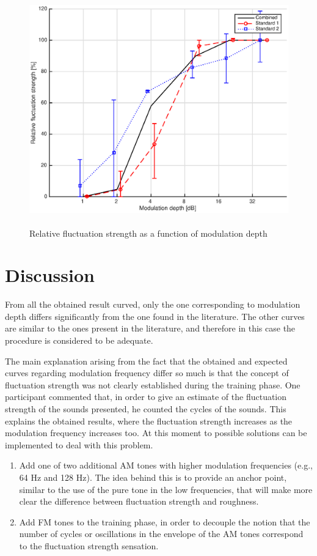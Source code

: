 \documentclass[a4paper]{article}
\begin{document}
\begin{figure}[ht!]
  \centering
  \includegraphics[height=10cm]{img/AM-md-All-standards.eps}
  \caption{Relative fluctuation strength as a function of modulation depth}
\label{fig:md-all}
\end{figure}


\section{Discussion} %
\label{sec:discussion}

From all the obtained result curved, only the one corresponding to modulation
depth differs significantly from the one found in the literature. The other
curves are similar to the ones present in the literature, and therefore in this
case the procedure is considered to be adequate.

The main explanation arising from the fact that the obtained and expected curves
regarding modulation frequency differ so much is that the concept of fluctuation
strength was not clearly established during the training phase. One participant
commented that, in order to give an estimate of the fluctuation strength of the
sounds presented, he counted the cycles of the sounds. This explains the
obtained results, where the fluctuation strength increases as the modulation
frequency increases too. At this moment to possible solutions can be implemented
to deal with this problem.

\begin{enumerate}
  \item Add one of two additional AM tones with higher modulation frequencies
  (e.g., 64 Hz and 128 Hz). The idea behind this is to provide an anchor point,
  similar to the use of the pure tone in the low frequencies, that will make
  more clear the difference between fluctuation strength and roughness.
  \item Add FM tones to the training phase, in order to decouple the notion that
  the number of cycles or oscillations in the envelope of the AM tones
  correspond to the fluctuation strength sensation.
\end{enumerate}
\end{document}
